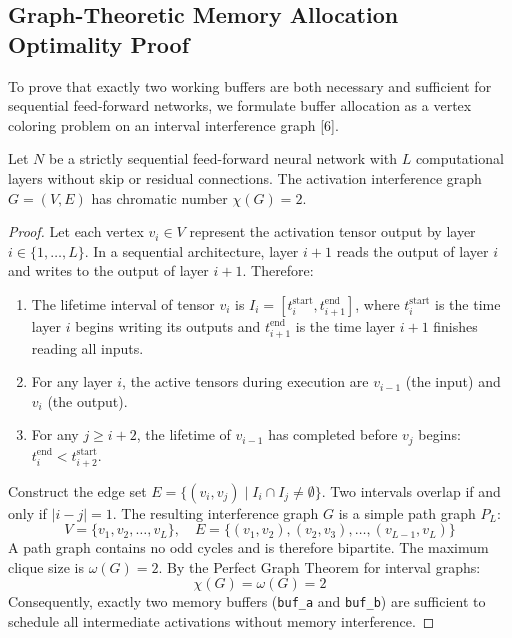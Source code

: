 \documentclass[11pt,a4paper]{article}
\begin{document}

\subsection{Graph-Theoretic Memory Allocation Optimality Proof}
\label{sec:graph_coloring_proof}

To prove that exactly two working buffers are both necessary and sufficient for sequential feed-forward networks, we formulate buffer allocation as a vertex coloring problem on an interval interference graph [6].

\begin{theorem}
Let $N$ be a strictly sequential feed-forward neural network with $L$ computational layers without skip or residual connections. The activation interference graph $G = (V, E)$ has chromatic number $\chi(G) = 2$.
\end{theorem}

\begin{proof}
Let each vertex $v_i \in V$ represent the activation tensor output by layer $i \in \{1, \dots, L\}$. In a sequential architecture, layer $i+1$ reads the output of layer $i$ and writes to the output of layer $i+1$. Therefore:
\begin{enumerate}
    \item The lifetime interval of tensor $v_i$ is $I_i = [t_i^{\text{start}}, t_{i+1}^{\text{end}}]$, where $t_i^{\text{start}}$ is the time layer $i$ begins writing its outputs and $t_{i+1}^{\text{end}}$ is the time layer $i+1$ finishes reading all inputs.
    \item For any layer $i$, the active tensors during execution are $v_{i-1}$ (the input) and $v_i$ (the output).
    \item For any $j \ge i+2$, the lifetime of $v_{i-1}$ has completed before $v_{j}$ begins: $t_i^{\text{end}} < t_{i+2}^{\text{start}}$.
\end{enumerate}
Construct the edge set $E = \{ (v_i, v_j) \mid I_i \cap I_j \neq \emptyset \}$. Two intervals overlap if and only if $|i - j| = 1$. The resulting interference graph $G$ is a simple path graph $P_L$:
\begin{equation}
V = \{v_1, v_2, \dots, v_L\}, \quad E = \{(v_1, v_2), (v_2, v_3), \dots, (v_{L-1}, v_L)\}
\end{equation}
A path graph contains no odd cycles and is therefore bipartite. The maximum clique size is $\omega(G) = 2$. By the Perfect Graph Theorem for interval graphs:
\begin{equation}
\chi(G) = \omega(G) = 2
\end{equation}
Consequently, exactly two memory buffers (\texttt{buf\_a} and \texttt{buf\_b}) are sufficient to schedule all intermediate activations without memory interference.
\end{proof}
\end{document}
